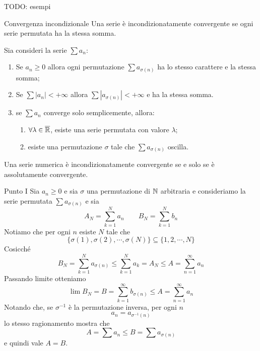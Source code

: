 \documentclass[a4paper]{article}
\begin{document}
TODO: esempi

\begin{snippetdefinition}{Convergenza incondizionale}
    Una serie è incondizionatamente convergente se ogni serie permutata
    ha la stessa somma.
\end{snippetdefinition}

\begin{snippettheorem}{}
    Sia consideri la serie \(\sum a_n\):
    \begin{enumerate}
        \item Se \(a_n \geq 0\) allora ogni permutazione \(\sum a_{\sigma(n)}\) ha lo stesso carattere e la stessa somma;
        \item Se \(\sum |a_n| < +\infty\) allora \(\sum |a_{\sigma(n)}| < +\infty\) e ha la stessa somma.
        \item {} se \(\sum a_n\) converge solo semplicemente,
        allora:
        \begin{enumerate}
            \item \(\forall \lambda \in \overline{\mathbb{R}}\), esiste una serie permutata con valore \(\lambda\);
            \item esiste una permutazione \(\sigma\) tale che \(\sum a_{\sigma(n)}\) oscilla.
        \end{enumerate}
    \end{enumerate}
\end{snippettheorem}

\begin{snippetcorollary}{}
    Una serie numerica è incondizionatamente convergente se e solo se è assolutamente convergente.
\end{snippetcorollary}

\begin{snippetproof}{Punto I}
    Sia \(a_n \geq 0\) e sia \(\sigma\) una permutazione di \(\mathbb{N}\) arbitraria
    e consideriamo la serie permutata \(\sum a_{\sigma(n)}\)
    e sia
    \[
        A_N = \sum_{k=1}^N a_n \qquad B_N = \sum_{k=1}^N b_n
    \]
    Notiamo che per ogni \(n\) esiste \(N\) tale che
    \[
        \{\sigma(1), \sigma(2), \cdots, \sigma(N) \}
        \subseteq \{1,2,\cdots, N\}
    \]
    Cosicché
    \[
        B_N = \sum_{k=1}^N a_{\sigma(n)} \leq \sum_{k=1}^N a_k = A_N \leq A = \sum_{n=1}^\infty a_n
    \]
    Passando limite otteniamo
    \[
        \lim B_N = B = \sum_{k=1}^\infty b_{\sigma(n)} \leq A = \sum_{n=1}^\infty a_n
    \]
    Notando che, se \(\sigma^{-1}\) è la permutazione inversa, per ogni \(n\)
    \[
        a_n = a_{\sigma^{-1}(n)}
    \]
    lo stesso ragionamento mostra che
    \[
        A = \sum a_n \leq B = \sum a_{\sigma(n)}
    \]
    e quindi vale \(A = B\).
\end{snippetproof}
\end{document}
